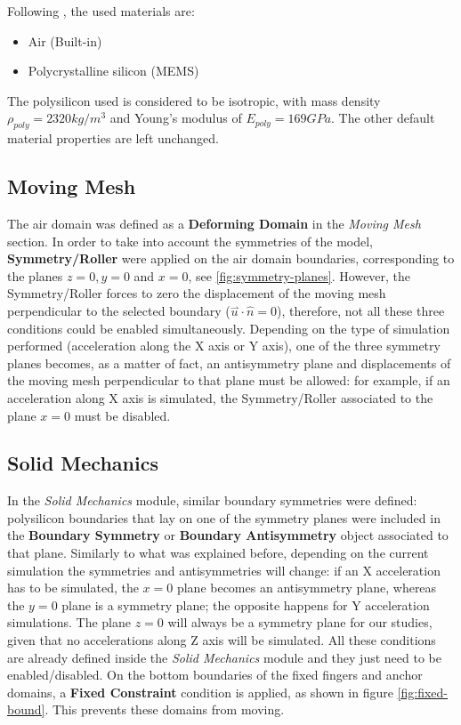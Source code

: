 \documentclass[lettersize,journal]{IEEEtran}
\begin{document}
        Following \cite{original}, the used materials are:
        
        \begin{itemize}
            \item Air (Built-in)
            \item Polycrystalline silicon (MEMS)
        \end{itemize}
        
        The polysilicon used is considered to be isotropic, with mass density \(\rho _{poly} =2320kg/m^3\) and Young's modulus of \(E_{poly}=169GPa\). The other default material properties are left unchanged.
        
         \subsection{Moving Mesh}
        The air domain was defined as a \textbf{Deforming Domain} in the \textit{Moving Mesh} section. In order to take into account the symmetries of the model, \textbf{Symmetry/Roller} were applied on the air domain boundaries, corresponding to the planes \(z=0, y=0\) and \(x=0\), see \ref{fig:symmetry-planes}. However, the Symmetry/Roller forces to zero the displacement of the moving mesh perpendicular to the selected boundary (\(\overset{\rightharpoonup}{u}\cdot\hat{n}=0\)), therefore, not all these three conditions could be enabled simultaneously. Depending on the type of simulation performed (acceleration along the X axis or Y axis), one of the three symmetry planes becomes, as a matter of fact, an antisymmetry plane and displacements of the moving mesh perpendicular to that plane must be allowed: for example, if an acceleration along X axis is simulated, the Symmetry/Roller associated to the plane \(x=0\) must be disabled.
        
        \subsection{Solid Mechanics}
        
        In the \textit{Solid Mechanics} module, similar boundary symmetries were defined: polysilicon boundaries that lay on one of the symmetry planes were included in the \textbf{Boundary Symmetry} or \textbf{Boundary Antisymmetry} object associated to that plane. Similarly to what was explained before, depending on the current simulation the symmetries and antisymmetries will change: if an X acceleration has to be simulated, the \(x=0\) plane becomes an antisymmetry plane, whereas the \(y=0\) plane is a symmetry plane; the opposite happens for Y acceleration simulations. The plane \(z=0\) will always be a symmetry plane for our studies, given that no accelerations along Z axis will be simulated. All these conditions are already defined inside the \textit{Solid Mechanics} module and they just need to be enabled/disabled. On the bottom boundaries of the fixed fingers and anchor domains, a \textbf{Fixed Constraint} condition is applied, as shown in figure \ref{fig:fixed-bound}. This prevents these domains from moving.
        
\end{document}
